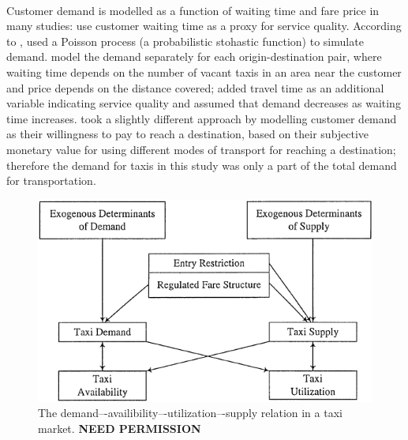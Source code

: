 \paragraph{}Customer demand is modelled as a function of waiting time and fare
price in many studies: \textcite{Douglas1972taxi+regulation,
Devany1975taxi+capacity, Cairns1996taxi+competition, Yang2002taxi+demand} use
customer waiting time as a proxy for service quality. According to
\textcite{Salanova2011taxi+review}, \textcite{Manski1967taxi+demand} used a
Poisson process (a probabilistic stohastic function) to simulate demand.
\textcite{Yang2002taxi+demand} model the demand separately for each 
origin-destination pair, where waiting time depends on the number of vacant 
taxis in an area near the customer and price depends on the distance covered;
\textcite{Yang2010taxi+nonlinear} added travel time as an additional variable
indicating service quality and assumed that demand decreases as waiting time
increases. \textcite{Yang2010taxi+equilibria} took a slightly different
approach by modelling customer demand as their willingness to pay to reach a
destination, based on their subjective monetary value for using different modes
of transport for reaching a destination; therefore the demand for taxis in this
study was only a part of the total demand for transportation.


\begin{figure}
  \begin{center}
    \includegraphics{../figures/taxi_demand}
    \caption{
      The demand–-availibility–-utilization–-supply relation in a taxi market. 
      \textbf{NEED PERMISSION}
      \label{figure:taxi}
    }
  \end{center}
\end{figure}
